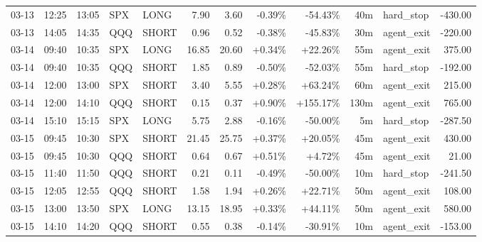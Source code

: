 \documentclass[11pt,a4paper,twoside]{article}
\begin{document}
\begin{center}
\begin{longtable}{>{\color{txtmain}}l l l l l r r r r r >{\color{txtmain}}l r}
03-13 & 12:25 & 13:05 & SPX & LONG & 7.90 & 3.60 & \textcolor{lossred}{-0.39\%} & \textcolor{lossred}{-54.43\%} & 40m & hard\_stop & \textcolor{lossred}{-430.00} \\
03-13 & 14:05 & 14:35 & QQQ & SHORT & 0.96 & 0.52 & \textcolor{lossred}{-0.38\%} & \textcolor{lossred}{-45.83\%} & 30m & agent\_exit & \textcolor{lossred}{-220.00} \\
03-14 & 09:40 & 10:35 & SPX & LONG & 16.85 & 20.60 & \textcolor{wingreen}{+0.34\%} & \textcolor{wingreen}{+22.26\%} & 55m & agent\_exit & \textcolor{wingreen}{375.00} \\
03-14 & 09:40 & 10:35 & QQQ & SHORT & 1.85 & 0.89 & \textcolor{lossred}{-0.50\%} & \textcolor{lossred}{-52.03\%} & 55m & hard\_stop & \textcolor{lossred}{-192.00} \\
03-14 & 12:00 & 13:00 & SPX & SHORT & 3.40 & 5.55 & \textcolor{wingreen}{+0.28\%} & \textcolor{wingreen}{+63.24\%} & 60m & agent\_exit & \textcolor{wingreen}{215.00} \\
03-14 & 12:00 & 14:10 & QQQ & SHORT & 0.15 & 0.37 & \textcolor{wingreen}{+0.90\%} & \textcolor{wingreen}{+155.17\%} & 130m & agent\_exit & \textcolor{wingreen}{765.00} \\
03-14 & 15:10 & 15:15 & SPX & LONG & 5.75 & 2.88 & \textcolor{lossred}{-0.16\%} & \textcolor{lossred}{-50.00\%} & 5m & hard\_stop & \textcolor{lossred}{-287.50} \\
03-15 & 09:45 & 10:30 & SPX & SHORT & 21.45 & 25.75 & \textcolor{wingreen}{+0.37\%} & \textcolor{wingreen}{+20.05\%} & 45m & agent\_exit & \textcolor{wingreen}{430.00} \\
03-15 & 09:45 & 10:30 & QQQ & SHORT & 0.64 & 0.67 & \textcolor{wingreen}{+0.51\%} & \textcolor{wingreen}{+4.72\%} & 45m & agent\_exit & \textcolor{wingreen}{21.00} \\
03-15 & 11:40 & 11:50 & QQQ & SHORT & 0.21 & 0.11 & \textcolor{lossred}{-0.49\%} & \textcolor{lossred}{-50.00\%} & 10m & hard\_stop & \textcolor{lossred}{-241.50} \\
03-15 & 12:05 & 12:55 & QQQ & SHORT & 1.58 & 1.94 & \textcolor{wingreen}{+0.26\%} & \textcolor{wingreen}{+22.71\%} & 50m & agent\_exit & \textcolor{wingreen}{108.00} \\
03-15 & 13:00 & 13:50 & SPX & LONG & 13.15 & 18.95 & \textcolor{wingreen}{+0.33\%} & \textcolor{wingreen}{+44.11\%} & 50m & agent\_exit & \textcolor{wingreen}{580.00} \\
03-15 & 14:10 & 14:20 & QQQ & SHORT & 0.55 & 0.38 & \textcolor{lossred}{-0.14\%} & \textcolor{lossred}{-30.91\%} & 10m & agent\_exit & \textcolor{lossred}{-153.00} \\

\end{longtable}
\end{center}
\end{document}
